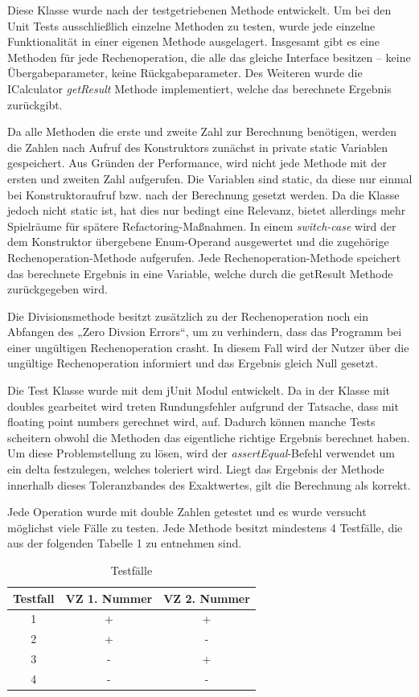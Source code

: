 Diese Klasse wurde nach der testgetriebenen Methode entwickelt. Um bei den Unit Tests ausschließlich einzelne Methoden zu testen, wurde jede einzelne Funktionalität in einer eigenen Methode ausgelagert. Insgesamt gibt es eine Methoden für jede Rechenoperation, die alle das gleiche Interface besitzen – keine Übergabeparameter, keine Rückgabeparameter. Des Weiteren wurde die ICalculator \textit{getResult} Methode implementiert, welche das berechnete Ergebnis zurückgibt.

Da alle Methoden die erste und zweite Zahl zur Berechnung benötigen, werden die Zahlen nach Aufruf des Konstruktors zunächst in private static Variablen gespeichert. Aus Gründen der Performance, wird nicht jede Methode mit der ersten und zweiten Zahl aufgerufen. Die Variablen sind static, da diese nur einmal bei Konstruktoraufruf bzw. nach der Berechnung gesetzt werden. Da die Klasse jedoch nicht static ist, hat dies nur bedingt eine Relevanz, bietet allerdings mehr Spielräume für spätere Refactoring-Maßnahmen.
In einem \textit{switch-case} wird der dem Konstruktor übergebene Enum-Operand ausgewertet und die zugehörige Rechenoperation-Methode aufgerufen. Jede Rechenoperation-Methode speichert das berechnete Ergebnis in eine Variable, welche durch die getResult Methode zurückgegeben wird.

Die Divisionsmethode besitzt zusätzlich zu der Rechenoperation noch ein Abfangen des „Zero Divsion Errors“, um zu verhindern, dass das Programm bei einer ungültigen Rechenoperation crasht. In diesem Fall wird der Nutzer über die ungültige Rechenoperation informiert und das Ergebnis gleich Null gesetzt.

Die Test Klasse wurde mit dem jUnit Modul entwickelt. Da in der Klasse mit doubles gearbeitet wird treten Rundungsfehler aufgrund der Tatsache, dass mit floating point numbers gerechnet wird, auf. Dadurch können manche Tests scheitern obwohl die Methoden das eigentliche richtige Ergebnis berechnet haben. Um diese Problemstellung zu lösen, wird der \textit{assertEqual}-Befehl verwendet um ein delta festzulegen, welches toleriert wird. Liegt das Ergebnis der Methode innerhalb dieses Toleranzbandes des Exaktwertes, gilt die Berechnung als korrekt.

Jede Operation wurde mit double Zahlen getestet und es wurde versucht möglichst viele Fälle zu testen. Jede Methode besitzt mindestens 4 Testfälle, die aus der folgenden Tabelle 1 zu entnehmen sind.

\begin{table}[H]
\centering
\begin{tabular}{c c c}
	Testfall & VZ 1. Nummer & VZ 2. Nummer\\
	\hline
	1 & + & +\\
	2 & + & -\\
	3 & - & +\\
	4 & - & -\\
\end{tabular}
\caption{Testfälle}
\end{table}

